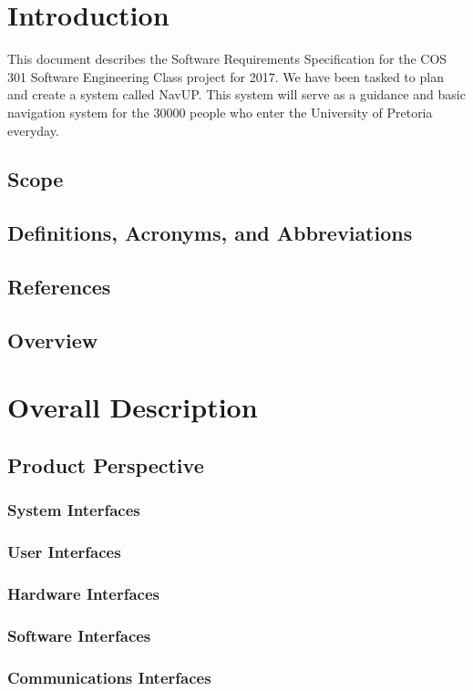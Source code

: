 \documentclass[12pt,a4paper]{article}
\begin{document}


\tableofcontents
\newpage

\section{Introduction}
This document describes the Software Requirements Specification for the COS 301 Software Engineering Class project for 2017. We have been tasked to plan and create a system called NavUP. This system will serve as a guidance and basic navigation system for the 30000 people who enter the University of Pretoria everyday.
	\subsection{Scope}
	\subsection{Definitions, Acronyms, and Abbreviations}
	\subsection{References}
	\subsection{Overview}
\section{Overall Description}
	\subsection{Product Perspective}
		\subsubsection{System Interfaces}
		\subsubsection{User Interfaces}
		\subsubsection{Hardware Interfaces}
		\subsubsection{Software Interfaces}
		\subsubsection{Communications Interfaces}
\end{document}

